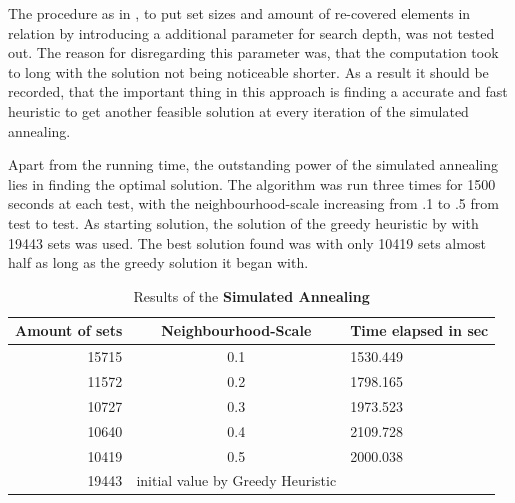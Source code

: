 \documentclass[a4paper]{article}
\begin{document}
The procedure as in \citeauthor{Jacobs1995}, to put set sizes and amount of re-covered elements in relation by introducing a additional parameter for search depth, was not tested out. The reason for disregarding this parameter was, that the computation took to long with the solution not being noticeable shorter. 
As a result it should be recorded, that the important thing in this approach is finding a accurate and fast heuristic to get another feasible solution at every iteration of the simulated annealing.

Apart from the running time, the outstanding power of the simulated annealing lies in finding the optimal solution. The algorithm was run three times for 1500 seconds at each test, with the neighbourhood-scale increasing from .1 to .5 from test to test. As starting solution, the solution of the greedy heuristic by \cite{balas1980set} with 19443 sets was used. The best solution found was with only 10419 sets almost half as long as the greedy solution it began with. 

\begin{table}[!b]
    \centering
    \begin{tabular}{r  c  l}
        Amount of sets & Neighbourhood-Scale & Time elapsed in sec\\
        \hline
        15715 & 0.1 & 1530.449 \\
        11572 & 0.2 & 1798.165 \\
        10727 & 0.3 & 1973.523 \\
        10640 & 0.4 & 2109.728 \\
        10419 & 0.5 & 2000.038 \\
        \hline
        19443 & initial value by Greedy Heuristic 
    \end{tabular}
    \caption{Results of the \textbf{Simulated Annealing}}
\end{table}
\end{document}
